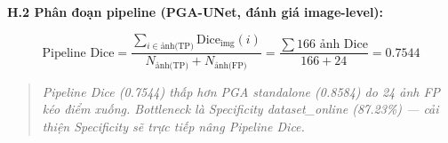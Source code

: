 \textbf{H.2 Phân đoạn pipeline (PGA-UNet, đánh giá image-level):}

\[
\text{Pipeline Dice} = \frac{\displaystyle\sum_{i \in \text{ảnh(TP)}} \text{Dice}_{\text{img}}(i)}{N_{\text{ảnh(TP)}} + N_{\text{ảnh(FP)}}} = \frac{\sum 166 \text{ ảnh Dice}}{166 + 24} = \mathbf{0.7544}
\]

\begin{table}[htbp]
\centering\renewcommand{\arraystretch}{1.2}
\end{table}

\begin{quote}\itshape Pipeline Dice (0.7544) thấp hơn PGA standalone (0.8584) do 24 ảnh FP kéo điểm xuống. Bottleneck là Specificity dataset\_online (87.23\%) — cải thiện Specificity sẽ trực tiếp nâng Pipeline Dice.\end{quote}

